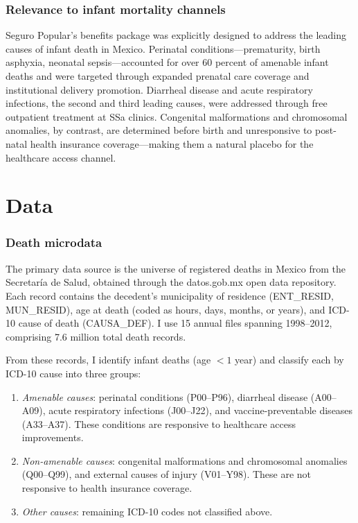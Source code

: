 \documentclass[12pt]{article}
\begin{document}
\subsubsection*{Relevance to infant mortality channels} Seguro Popular's benefits package was explicitly designed to address the leading causes of infant death in Mexico. Perinatal conditions---prematurity, birth asphyxia, neonatal sepsis---accounted for over 60 percent of amenable infant deaths and were targeted through expanded prenatal care coverage and institutional delivery promotion. Diarrheal disease and acute respiratory infections, the second and third leading causes, were addressed through free outpatient treatment at SSa clinics. Congenital malformations and chromosomal anomalies, by contrast, are determined before birth and unresponsive to post-natal health insurance coverage---making them a natural placebo for the healthcare access channel.

\section{Data}

\subsubsection*{Death microdata} The primary data source is the universe of registered deaths in Mexico from the Secretar\'{i}a de Salud, obtained through the datos.gob.mx open data repository. Each record contains the decedent's municipality of residence (ENT\_RESID, MUN\_RESID), age at death (coded as hours, days, months, or years), and ICD-10 cause of death (CAUSA\_DEF). I use 15 annual files spanning 1998--2012, comprising 7.6 million total death records.

From these records, I identify infant deaths (age $< 1$ year) and classify each by ICD-10 cause into three groups:
\begin{enumerate}
  \item \textit{Amenable causes}: perinatal conditions (P00--P96), diarrheal disease (A00--A09), acute respiratory infections (J00--J22), and vaccine-preventable diseases (A33--A37). These conditions are responsive to healthcare access improvements.
  \item \textit{Non-amenable causes}: congenital malformations and chromosomal anomalies (Q00--Q99), and external causes of injury (V01--Y98). These are not responsive to health insurance coverage.
  \item \textit{Other causes}: remaining ICD-10 codes not classified above.
\end{enumerate}
\end{document}
